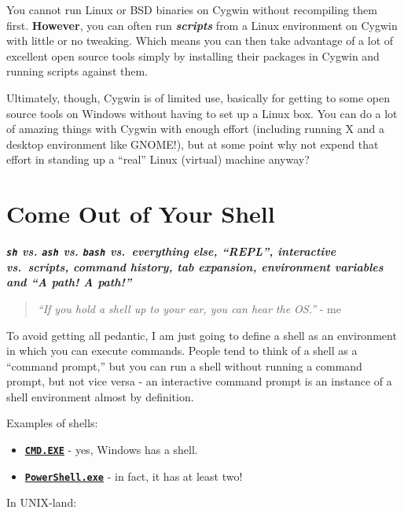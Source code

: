 \documentclass[10pt,]{book}
\numberwithin{figure}{chapter}
\begin{document}
You cannot run Linux or BSD binaries on Cygwin without recompiling them
first. \textbf{However}, you can often run \textbf{\emph{scripts}} from
a Linux environment on Cygwin with little or no tweaking. Which means
you can then take advantage of a lot of excellent open source tools
simply by installing their packages in Cygwin and running scripts
against them.

Ultimately, though, Cygwin is of limited use, basically for getting to
some open source tools on Windows without having to set up a Linux box.
You can do a lot of amazing things with Cygwin with enough effort
(including running X and a desktop environment like GNOME!), but at some
point why not expend that effort in standing up a ``real'' Linux
(virtual) machine anyway?

\chapter{Come Out of Your Shell}\label{come-out-of-your-shell}

\textbf{\emph{\texttt{sh} vs. \texttt{ash} vs. \texttt{bash}
vs.~everything else, ``REPL'', interactive vs.~scripts, command history,
tab expansion, environment variables and ``A path! A path!''}}

\begin{quote}
\emph{``If you hold a shell up to your ear, you can hear the OS.''} - me
\end{quote}

To avoid getting all pedantic, I am just going to define a shell as an
environment in which you can execute commands. People tend to think of a
shell as a ``command prompt,'' but you can run a shell without running a
command prompt, but not vice versa - an interactive command prompt is an
instance of a shell environment almost by definition.

Examples of shells:

\begin{itemize}
\item
  \href{https://technet.microsoft.com/en-us/library/cc754340.aspx}{\textbf{\texttt{CMD.EXE}}}
  - yes, Windows has a shell.
\item
  \href{https://technet.microsoft.com/en-us/library/ms714469\%28v=VS.85\%29.aspx}{\textbf{\texttt{PowerShell.exe}}}
  - in fact, it has at least two!
\end{itemize}

In UNIX-land:
\end{document}
